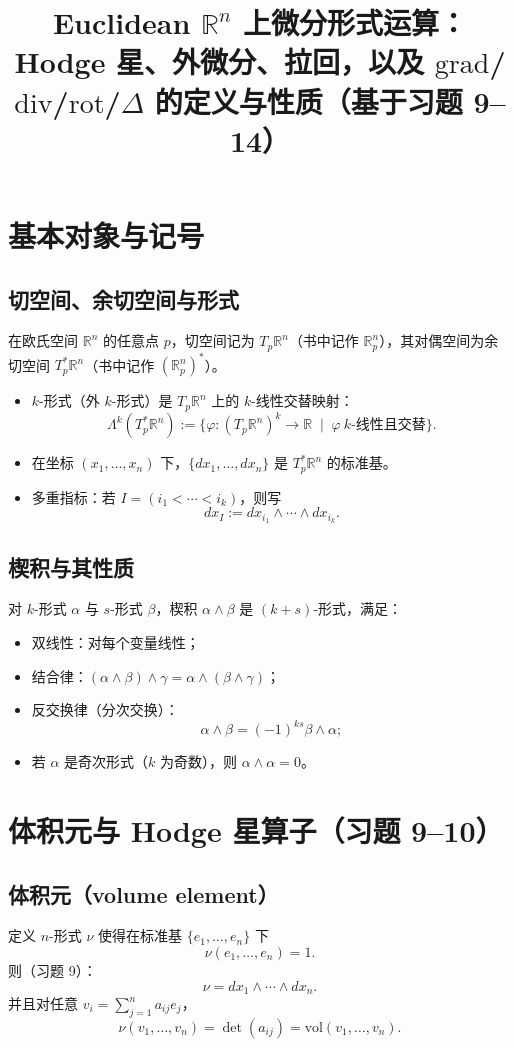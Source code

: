\documentclass[11pt,a4paper]{article}
\title{Euclidean $\mathbb{R}^n$ 上微分形式运算：Hodge 星、外微分、拉回，以及 $\mathrm{grad}$/$\mathrm{div}$/$\mathrm{rot}$/$\Delta$ 的定义与性质（基于习题 9--14）}
\author{}
\date{}
\newcommand{\R}{\mathbb{R}}
\newcommand{\vol}{\nu}
\begin{document}
\maketitle

\section{基本对象与记号}

\subsection{切空间、余切空间与形式}
在欧氏空间 $\R^n$ 的任意点 $p$，切空间记为 $T_p\R^n$（书中记作 $\R^n_p$），其对偶空间为余切空间 $T_p^\ast\R^n$（书中记作 $(\R^n_p)^\ast$）。

\begin{itemize}
  \item $k$-形式（外 $k$-形式）是 $T_p\R^n$ 上的 $k$-线性交替映射：
  \[
  \Lambda^k(T_p^\ast\R^n)
  :=\{\varphi:(T_p\R^n)^k\to\R\;\mid\;\varphi\ \text{$k$-线性且交替}\}.
  \]
  \item 在坐标 $(x_1,\dots,x_n)$ 下，$\{dx_1,\dots,dx_n\}$ 是 $T_p^\ast\R^n$ 的标准基。
  \item 多重指标：若 $I=(i_1<\cdots<i_k)$，则写
  \[
  dx_I:=dx_{i_1}\wedge\cdots\wedge dx_{i_k}.
  \]
\end{itemize}

\subsection{楔积与其性质}
对 $k$-形式 $\alpha$ 与 $s$-形式 $\beta$，楔积 $\alpha\wedge\beta$ 是 $(k+s)$-形式，满足：
\begin{itemize}
  \item 双线性：对每个变量线性；
  \item 结合律：$(\alpha\wedge\beta)\wedge\gamma=\alpha\wedge(\beta\wedge\gamma)$；
  \item 反交换律（分次交换）：
  \[
  \alpha\wedge\beta = (-1)^{ks}\beta\wedge\alpha;
  \]
  \item 若 $\alpha$ 是奇次形式（$k$ 为奇数），则 $\alpha\wedge\alpha=0$。
\end{itemize}

\section{体积元与 Hodge 星算子（习题 9--10）}

\subsection{体积元（volume element）}
定义 $n$-形式 $\vol$ 使得在标准基 $\{e_1,\dots,e_n\}$ 下
\[
\vol(e_1,\dots,e_n)=1.
\]
则（习题 9）：
\[
\boxed{\ \vol = dx_1\wedge\cdots\wedge dx_n.\ }
\]
并且对任意 $v_i=\sum_{j=1}^n a_{ij}e_j$，
\[
\boxed{\ \vol(v_1,\dots,v_n)=\det(a_{ij}) = \mathrm{vol}(v_1,\dots,v_n).\ }
\]
\end{document}
